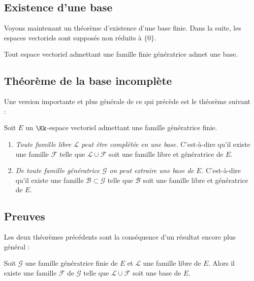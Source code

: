 \documentclass[class=report,crop=false]{standalone}
\begin{document}
\subsection{Existence d'une base}

Voyons maintenant un théorème d'existence d'une base finie. Dans la suite,
les espaces vectoriels sont supposés non réduits à $\{0\}$.
\begin{theoreme}
\label{th:existencebase}
Tout espace vectoriel admettant une famille finie génératrice admet une base.
\end{theoreme}


\subsection{Théorème de la base incomplète}

Une version importante et plus générale de ce qui précède est le théorème suivant :
\begin{theoreme}
\label{th:baseincomplete}
Soit $E$ un $\Kk$-espace vectoriel admettant une famille génératrice finie.
\begin{enumerate}
  \item \emph{Toute famille libre $\mathcal{L}$ peut être complétée en une base.}
  C'est-à-dire qu'il existe une famille $\mathcal{F}$ telle que
  $\mathcal{L} \cup \mathcal{F}$ soit une famille libre et génératrice de $E$.

  \item \emph{De toute famille génératrice $\mathcal{G}$ on peut extraire une base de $E$.}
  C'est-à-dire qu'il existe une famille $\mathcal{B} \subset \mathcal{G}$ telle que
  $\mathcal{B}$ soit une famille libre et génératrice de $E$.
\end{enumerate}
\end{theoreme}




\subsection{Preuves}

Les deux théorèmes précédents sont la conséquence d'un résultat encore plus général :
\begin{theoreme}
\label{th:superbaseincomplete}
Soit $\mathcal{G}$ une famille génératrice finie de $E$
et $\mathcal{L}$ une famille libre de $E$.
Alors il existe une famille $\mathcal{F}$ de $\mathcal{G}$ telle que
$\mathcal{L} \cup \mathcal{F}$ soit une base de $E$.
\end{theoreme}
\end{document}
